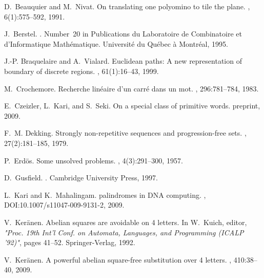 \documentclass[12pt]{article}
\begin{document}
\begin{thebibliography}{10}

D.~Beauquier and M.~Nivat.
\newblock On translating one polyomino to tile the plane.
, 6(1):575--592, 1991.

J.~Berstel.
.
\newblock Number~20 in Publications du Laboratoire de Combinatoire et
  d'Informatique Math\'ematique. Universit\'e du Qu\'ebec \`a Montr\'eal, 1995.

{J.-P.} Braquelaire and A.~Vialard.
\newblock Euclidean paths: A new representation of boundary of discrete
  regions.
, 61(1):16--43, 1999.

M.~Crochemore.
\newblock Recherche lin\'eaire d'un carr\'e dans un mot.
, 296:781--784, 1983.

E.~Czeizler, L.~Kari, and S.~Seki.
\newblock On a special class of primitive words.
\newblock preprint, 2009.

F.~M. Dekking.
\newblock Strongly non-repetitive sequences and progression-free sets.
, 27(2):181--185, 1979.

P.~{Erd\"os}.
\newblock Some unsolved problems.
, 4(3):291--300, 1957.

D.~Gusfield.
.
\newblock Cambridge University Press, 1997.

L.~Kari and K.~Mahalingam.
 palindromes in {DNA} computing.
, DOI:10.1007/s11047-009-9131-2, 2009.

V.~{Ker\"anen}.
\newblock Abelian squares are avoidable on 4 letters.
\newblock In W.~Kuich, editor, {\em "Proc. 19th Int'l Conf. on Automata,
  Languages, and Programming (ICALP '92)"}, pages 41--52. Springer-Verlag,
  1992.

V.~{Ker\"anen}.
\newblock A powerful abelian square-free substitution over 4 letters.
, 410:38--40, 2009.


\end{thebibliography}
\end{document}
